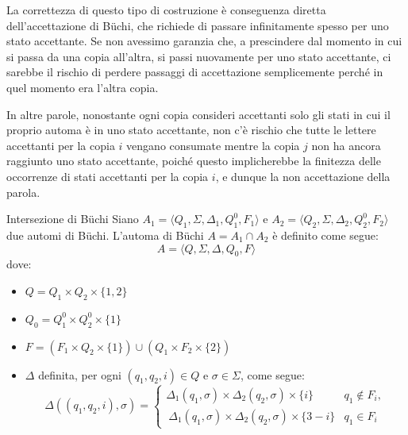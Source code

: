\begin{note}{}
  La correttezza di questo tipo di costruzione è conseguenza diretta dell'accettazione di Büchi, che richiede di passare infinitamente spesso per uno stato accettante. Se non avessimo garanzia che, a prescindere dal momento in cui si passa da una copia all'altra, si passi nuovamente per uno stato accettante, ci sarebbe il rischio di perdere passaggi di accettazione semplicemente perché in quel momento era  l'altra copia.

  In altre parole, nonostante ogni copia consideri accettanti solo gli stati in cui il proprio automa è in uno stato accettante, non c'è rischio che tutte le lettere accettanti per la copia \(i\) vengano consumate mentre la copia \(j\) non ha ancora raggiunto uno stato accettante, poiché questo implicherebbe la finitezza delle occorrenze di stati accettanti per la copia \(i\), e dunque la non accettazione della parola.
\end{note}

\begin{definition}{Intersezione di Büchi}
  Siano \(A_1 = \langle Q_1, \Sigma, \Delta_1, Q_{1}^0, F_1\rangle\) e \(A_2 = \langle Q_2, \Sigma, \Delta_2, Q_{2}^0, F_2\rangle\) due automi di Büchi. L'automa di Büchi \(A = A_1 \cap A_2\) è definito come segue:
  \[
    A = \langle Q, \Sigma, \Delta, Q_0, F\rangle
  \]
  dove:
  \begin{itemize}
    \item \(Q = Q_1 \times Q_2 \times \{1, 2\}\)
    \item \(Q_0 = Q_{1}^0 \times Q_{2}^0 \times \{1\}\)
    \item \(F = (F_1 \times Q_2 \times \{1\}) \cup (Q_1 \times F_2 \times \{2\})\)
    \item \(\Delta\) definita, per ogni \((q_1, q_2, i) \in Q\) e \(\sigma \in \Sigma\), come segue:
    \[
      \Delta((q_1, q_2, i), \sigma) = \begin{cases}
        \Delta_1(q_1, \sigma) \times \Delta_2(q_2, \sigma) \times \{i\} & q_1 \notin F_i,\\\ 
        \Delta_1(q_1, \sigma) \times \Delta_2(q_2, \sigma) \times \{3-i\} & q_1 \in F_i
      \end{cases}
      \]
  \end{itemize}
  
\end{definition}

